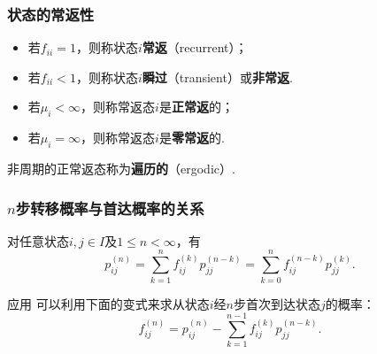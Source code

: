 \begin{frame}
    \frametitle{状态的常返性}
    \begin{mydefinition}[状态的常返性与瞬过性]
        \begin{itemize}
            \item 若$f_{ii}=1$，则称状态$i$\textbf{常返}（recurrent）；
            \item 若$f_{ii}<1$，则称状态$i$\textbf{瞬过}（transient）或\textbf{非常返}.
        \end{itemize}
    \end{mydefinition}
    \begin{mydefinition}[常返态的分类]
        \begin{itemize}
            \item 若$\mu_i<\infty$，则称常返态$i$是\textbf{正常返}的；
            \item 若$\mu_i=\infty$，则称常返态$i$是\textbf{零常返}的. 
        \end{itemize}
    \end{mydefinition}
    \begin{mydefinition}[遍历态]
        非周期的正常返态称为\textbf{遍历的}（ergodic）.
    \end{mydefinition}
\end{frame}

\begin{frame}
    \frametitle{$n$步转移概率与首达概率的关系}
    \begin{mytheorem}[$n$步转移概率与首达概率的关系]
        对任意状态$i,j\in I$及$1\leqslant n<\infty$，有
        \begin{equation*}
            p_{ij}^{(n)}=\sum_{k=1}^n f_{ij}^{(k)}p_{jj}^{(n-k)}=\sum_{k=0}^nf_{ij}^{(n-k)}p_{jj}^{(k)}.
        \end{equation*}
    \end{mytheorem}
    \begin{exampleblock}{应用}
        可以利用下面的变式来求从状态$i$经$n$步首次到达状态$j$的概率：
        \begin{equation}
            f_{ij}^{(n)}=p_{ij}^{(n)}-\sum_{k=1}^{n-1}f_{ij}^{(k)}p_{jj}^{(n-k)}.
        \end{equation}
    \end{exampleblock}
\end{frame}

